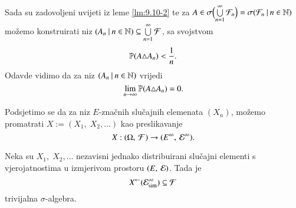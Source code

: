 \begin{rj}[\ref{zad:9.10}]
    Sada su zadovoljeni uvijeti iz leme \ref{lm:9.10-2} te za $A \in \sigma \Big( {\bigcup\limits_{n = 1}^{\infty} \mathcal{F}_n} \Big) = \sigma({\mathcal{F}_n} \: | \: {n \in \mathbb{N}})$ mo\v zemo konstruirati niz $({A_n} \: | \: {n \in \mathbb{N}}) \subseteq \bigcup\limits_{n = 1}^{\infty} \mathcal{F}$, sa svojstvom
    \begin{equation*}
        \mathbb{P} (A \triangle A_n) < \frac{1}{n}.
    \end{equation*}
    Odavde vidimo da za niz $({A_n} \: | \: {n \in \mathbb{N}})$ vrijedi
    \begin{equation*}
        \lim\limits_{n \to \infty} \mathbb{P} (A \triangle A_n) = 0.
    \end{equation*}
\end{rj}

Podsjetimo se da za niz $E$-zna\v cnih slu\v cajnih elemenata $(X_n)$, mo\v zemo promatrati $X:=(X_1, \; X_2, \ldots)$ kao preslikavanje
\begin{equation*}
    X: ({\Omega}, \: {\mathcal{F}}) \to ({E^\infty}, \: {\mathcal{E}^\infty}).
\end{equation*}

\begin{tm}    \label{tm:9.11}
    Neka su $X_1, \; X_2, \ldots$ nezavisni jednako distribuirani slu\v cajni elementi s vjerojatnostima u izmjerivom prostoru $({E}, \: {\mathcal{E}})$.
    Tada je
    \begin{equation*}
        {X}^{\leftarrow}(\mathcal{E}_{\mathrm{sim}}^\infty) \subseteq \mathcal{F}    
    \end{equation*}
    trivijalna $\sigma$-algebra.
\end{tm}

